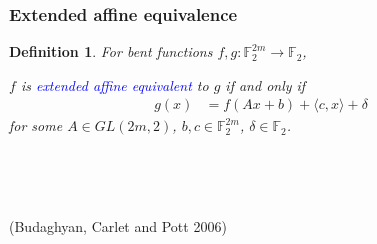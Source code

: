 \documentclass[pdf,sprung,slideColor,nocolorBG]{beamer}
\newenvironment{colortheme}[1]{
\def\ProvidesPackageRCS $##1${\relax}
\renewcommand{\ProcessOptions}{\relax}
\makeatletter

\makeatother
}{}
\newcommand{\slidecite}[1]{\tiny{(#1)}\normalsize{}}
\newcommand{\mb}[1]{\mathbb{#1}}
\newcommand{\Emph}[1]{\emph{\textcolor{blue}{#1}}}
\newcommand{\To}{\rightarrow}
\newcommand{\F}{\mb{F}}
\newtheorem{Def}{Definition}
\begin{document}
\begin{colortheme}{seagull}

\begin{frame}
\frametitle{Extended affine equivalence}

\begin{Def}
For bent functions $f,g : \F_2^{2m} \To \F_2$,

$f$ is \Emph{extended affine equivalent} to $g$ if and only if
\begin{align*}
g(x) &= f(A x + b) + \langle c, x \rangle + \delta
\end{align*}
for some $A \in GL(2m,2)$, $b, c \in \F_2^{2m}$, $\delta \in \F_2$.
\end{Def}

~

~

\slidecite{Budaghyan, Carlet and Pott 2006}
\end{frame}

\end{colortheme}
\end{document}
